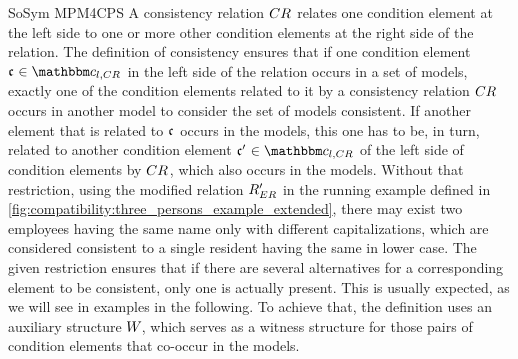 \begin{copiedFrom}{SoSym MPM4CPS}
A consistency relation $CR_{}$ relates one condition element at the left side to one or more other condition elements at the right side of the relation.
The definition of consistency ensures that if one condition element $\conditionelement{c}{} \in \condition{c}{l,\consistencyrelation{CR}{}}$ in the left side of the relation occurs in a set of models, exactly one of the condition elements related to it by a consistency relation $CR_{}$ occurs in another model to consider the set of models consistent.
If another element that is related to $\mathfrak{c}_{}$ occurs in the models, this one has to be, in turn, related to another condition element $\conditionelement{c'}{} \in \condition{c}{l,\consistencyrelation{CR}{}}$ of the left side of condition elements by $CR_{}$, which also occurs in the models.
Without that restriction, using the modified relation $R_{ER}'$ in the running example defined in \autoref{fig:compatibility:three_persons_example_extended}, there may exist two employees having the same name only with different capitalizations, which are considered consistent to a single resident having the same in lower case.
The given restriction ensures that if there are several alternatives for a corresponding element to be consistent, only one is actually present.
This is usually expected, as we will see in examples in the following.
To achieve that, the definition uses an auxiliary structure $W_{}$, which serves as a witness structure for those pairs of condition elements that co-occur in the models.


\end{copiedFrom}
